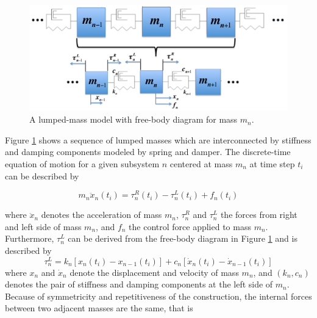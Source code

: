 \documentclass[11pt]{ucthesis}
\newcommand{\beq}{\begin{equation}}
\newcommand{\eeq}{\end{equation}}
\begin{document}
\begin{figure}[thpb]
\centering
\includegraphics[width=1\linewidth]{Figures/full_mass_n.png}
\caption{A lumped-mass model with free-body diagram for mass $m_n$.}
\label{fig:gen}
\end{figure}

Figure \ref{fig:gen} shows a sequence of lumped masses which are interconnected by stiffness and damping components modeled by spring and damper. The discrete-time equation of motion for a given subsystem $n$ centered at mass $m_n$ at time step $t_i$ can be described by \cite{kumar1986new}

\beq \label{eqn:nEOM}
m_n \ddot{x}_n (t_i)=\tau^R_n(t_i)-\tau^L_n(t_i)+f_n(t_i)
\eeq

where $\ddot{x}_n$ denotes the acceleration of mass $m_n$, $\tau^{R}_{n}$ and $\tau^{L}_{n}$ the forces from right and left side of mass $m_n$, and $f_n$ the control force applied to mass $m_n$. Furthermore, $\tau^{L}_{n}$ can be derived from the free-body diagram in Figure \ref{fig:gen} and is described by
\beq
\tau_n^L = k_n \left[x_n(t_i)-x_{n-1}(t_i)\right]+c_n \left[\dot{x}_n(t_i)-\dot{x}_{n-1}(t_i) \right]
\eeq
where ${x}_n$ and $\dot{x}_n$ denote the displacement and velocity of mass $m_n$, and $(k_n,c_n)$ denotes the pair of stiffness and damping components at the left side of $m_n$. Because of symmetricity and repetitiveness of the construction, the internal forces between two adjacent masses are the same, that is
\end{document}
